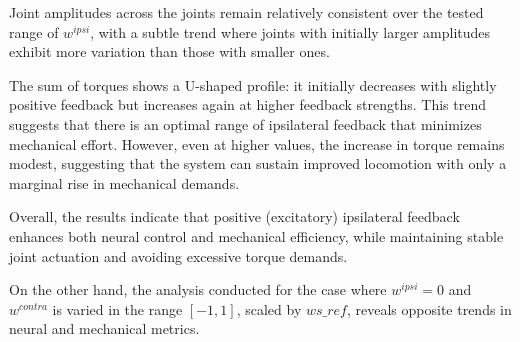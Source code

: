 \documentclass{cmc}
\begin{document}
Joint amplitudes across the joints remain relatively consistent over the tested range of \( w^{ipsi} \), with a subtle trend where joints with initially larger amplitudes exhibit more variation than those with smaller ones. 

The sum of torques shows a U-shaped profile: it initially decreases with slightly positive feedback but increases again at higher feedback strengths. This trend suggests that there is an optimal range of ipsilateral feedback that minimizes mechanical effort. However, even at higher values, the increase in torque remains modest, suggesting that the system can sustain improved locomotion with only a marginal rise in mechanical demands.

Overall, the results indicate that positive (excitatory) ipsilateral feedback enhances both neural control and mechanical efficiency, while maintaining stable joint actuation and avoiding excessive torque demands.

On the other hand, the analysis conducted for the case where \( w^{ipsi} = 0 \) and \( w^{contra} \) is varied in the range \([-1, 1]\), scaled by \( ws\_ref \), reveals opposite trends in neural and mechanical metrics. 

\end{document}
